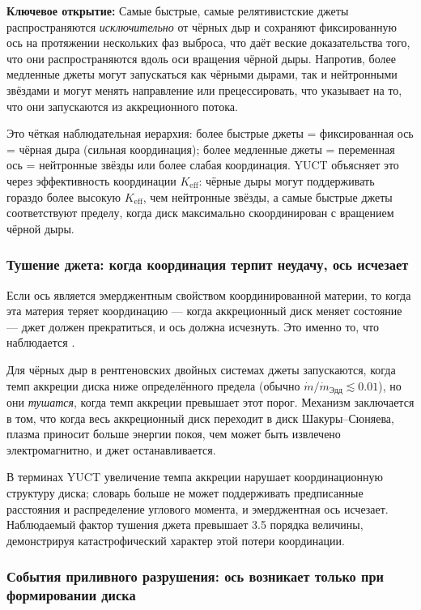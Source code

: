 \documentclass[12pt,a4paper]{article}
\begin{document}
	\textbf{Ключевое открытие:} Самые быстрые, самые релятивистские джеты распространяются \emph{исключительно} от чёрных дыр и сохраняют фиксированную ось на протяжении нескольких фаз выброса, что даёт веские доказательства того, что они распространяются вдоль оси вращения чёрной дыры. Напротив, более медленные джеты могут запускаться как чёрными дырами, так и нейтронными звёздами и могут менять направление или прецессировать, что указывает на то, что они запускаются из аккреционного потока.
	
	Это чёткая наблюдательная иерархия: более быстрые джеты = фиксированная ось = чёрная дыра (сильная координация); более медленные джеты = переменная ось = нейтронные звёзды или более слабая координация. YUCT объясняет это через эффективность координации \(K_{\mathrm{eff}}\): чёрные дыры могут поддерживать гораздо более высокую \(K_{\mathrm{eff}}\), чем нейтронные звёзды, а самые быстрые джеты соответствуют пределу, когда диск максимально скоординирован с вращением чёрной дыры.
	
	\subsubsection{Тушение джета: когда координация терпит неудачу, ось исчезает}
	
	Если ось является эмерджентным свойством координированной материи, то когда эта материя теряет координацию — когда аккреционный диск меняет состояние — джет должен прекратиться, и ось должна исчезнуть. Это именно то, что наблюдается \cite{JetQuenching2006,JetQuenching2018}.
	
	Для чёрных дыр в рентгеновских двойных системах джеты запускаются, когда темп аккреции диска ниже определённого предела (обычно \(\dot{m}/\dot{m}_{\text{Эдд}} \lesssim 0.01\)), но они \emph{тушатся}, когда темп аккреции превышает этот порог. Механизм заключается в том, что когда весь аккреционный диск переходит в диск Шакуры–Сюняева, плазма приносит больше энергии покоя, чем может быть извлечено электромагнитно, и джет останавливается.
	
	В терминах YUCT увеличение темпа аккреции нарушает координационную структуру диска; словарь больше не может поддерживать предписанные расстояния и распределение углового момента, и эмерджентная ось исчезает. Наблюдаемый фактор тушения джета превышает 3.5 порядка величины, демонстрируя катастрофический характер этой потери координации.
	
	\subsubsection{События приливного разрушения: ось возникает только при формировании диска}
	
\end{document}
